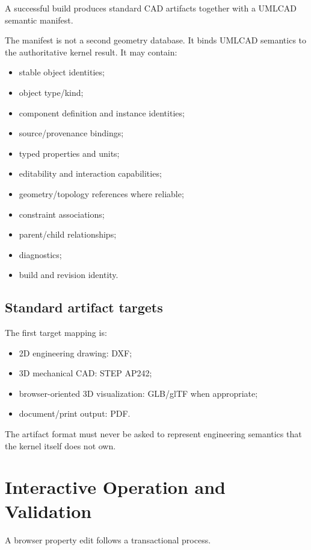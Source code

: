 \documentclass[11pt,a4paper]{article}
\begin{document}
A successful build produces standard CAD artifacts together with a UMLCAD semantic manifest.

The manifest is not a second geometry database. It binds UMLCAD semantics to the authoritative kernel result. It may contain:
\begin{itemize}
    \item stable object identities;
    \item object type/kind;
    \item component definition and instance identities;
    \item source/provenance bindings;
    \item typed properties and units;
    \item editability and interaction capabilities;
    \item geometry/topology references where reliable;
    \item constraint associations;
    \item parent/child relationships;
    \item diagnostics;
    \item build and revision identity.
\end{itemize}

\subsection{Standard artifact targets}

The first target mapping is:
\begin{itemize}
    \item 2D engineering drawing: DXF;
    \item 3D mechanical CAD: STEP AP242;
    \item browser-oriented 3D visualization: GLB/glTF when appropriate;
    \item document/print output: PDF.
\end{itemize}

The artifact format must never be asked to represent engineering semantics that the kernel itself does not own.

\section{Interactive Operation and Validation}

A browser property edit follows a transactional process.
\end{document}
